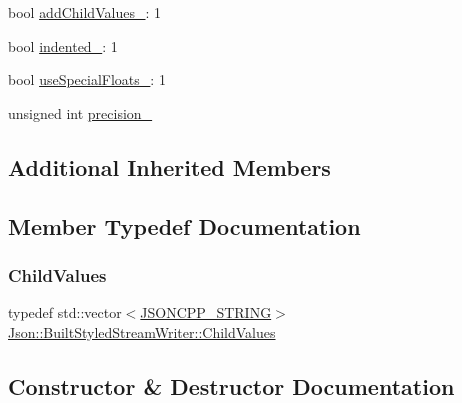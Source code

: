 \begin{DoxyCompactItemize}
\item 
bool \hyperlink{structJson_1_1BuiltStyledStreamWriter_abed9cc31da503b48798e7cea68c42e16_abed9cc31da503b48798e7cea68c42e16}{add\+Child\+Values\+\_\+}\+: 1
\item 
bool \hyperlink{structJson_1_1BuiltStyledStreamWriter_a6aa0ad023e623f600103631a6bca6d10_a6aa0ad023e623f600103631a6bca6d10}{indented\+\_\+}\+: 1
\item 
bool \hyperlink{structJson_1_1BuiltStyledStreamWriter_a6f1b8694b4eb17ab8c34f6d6dd8c8a4a_a6f1b8694b4eb17ab8c34f6d6dd8c8a4a}{use\+Special\+Floats\+\_\+}\+: 1
\item 
unsigned int \hyperlink{structJson_1_1BuiltStyledStreamWriter_a6373d8d0ae4741b64e3904e4db0eef46_a6373d8d0ae4741b64e3904e4db0eef46}{precision\+\_\+}
\end{DoxyCompactItemize}
\subsection*{Additional Inherited Members}


\subsection{Member Typedef Documentation}
\mbox{\label{structJson_1_1BuiltStyledStreamWriter_a63196b38400e5ce452f65ce856d47b6f_a63196b38400e5ce452f65ce856d47b6f}} 
\subsubsection{\texorpdfstring{Child\+Values}{ChildValues}}
{\footnotesize\ttfamily typedef std\+::vector$<$\hyperlink{json_8h_a1e723f95759de062585bc4a8fd3fa4be_a1e723f95759de062585bc4a8fd3fa4be}{J\+S\+O\+N\+C\+P\+P\+\_\+\+S\+T\+R\+I\+NG}$>$ \hyperlink{structJson_1_1BuiltStyledStreamWriter_a63196b38400e5ce452f65ce856d47b6f_a63196b38400e5ce452f65ce856d47b6f}{Json\+::\+Built\+Styled\+Stream\+Writer\+::\+Child\+Values}\hspace{0.3cm}{\ttfamily [private]}}



\subsection{Constructor \& Destructor Documentation}
\mbox{\label{structJson_1_1BuiltStyledStreamWriter_adf11b7d1ee3c68d096b7c662ee85948e_adf11b7d1ee3c68d096b7c662ee85948e}} 
